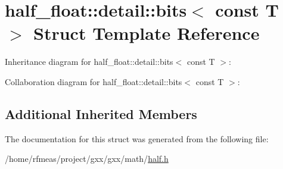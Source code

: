 \hypertarget{structhalf__float_1_1detail_1_1bits_3_01const_01T_01_4}{}\section{half\+\_\+float\+:\+:detail\+:\+:bits$<$ const T $>$ Struct Template Reference}
\label{structhalf__float_1_1detail_1_1bits_3_01const_01T_01_4}


Inheritance diagram for half\+\_\+float\+:\+:detail\+:\+:bits$<$ const T $>$\+:


Collaboration diagram for half\+\_\+float\+:\+:detail\+:\+:bits$<$ const T $>$\+:
\subsection*{Additional Inherited Members}


The documentation for this struct was generated from the following file\+:\begin{DoxyCompactItemize}
\item 
/home/rfmeas/project/gxx/gxx/math/\hyperlink{half_8h}{half.\+h}\end{DoxyCompactItemize}
